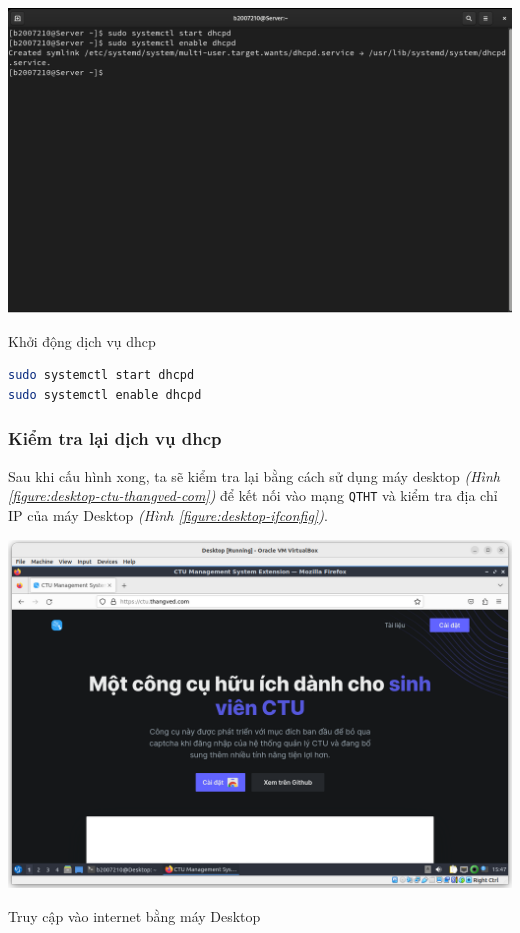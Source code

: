 \documentclass[a4paper, 11pt]{article}
\begin{document}
\begin{minipage}
    {\linewidth}
    \captionsetup{type=figure}
    \centering
    \includegraphics[width=\linewidth]{images/start-enable-dhcpd.png}
    \caption{Khởi động dịch vụ dhcp}
    \label{figure:start-enable-dhcpd}
\end{minipage}
\begin{lstlisting}[language=bash, caption=Khởi động dịch vụ dhcp]
sudo systemctl start dhcpd
sudo systemctl enable dhcpd
\end{lstlisting}

\subsubsection{Kiểm tra lại dịch vụ dhcp}

Sau khi cấu hình xong, ta sẽ kiểm tra lại bằng cách sử dụng máy desktop \textit{(Hình \ref{figure:desktop-ctu-thangved-com})} để kết nối vào mạng \texttt{QTHT} và kiểm tra địa chỉ IP của máy Desktop \textit{(Hình \ref{figure:desktop-ifconfig})}.

\begin{minipage}
    {\linewidth}
    \captionsetup{type=figure}
    \centering
    \includegraphics[width=\linewidth]{images/desktop-ctu-thangved-com.png}
    \caption{Truy cập vào internet bằng máy Desktop}
    \label{figure:desktop-ctu-thangved-com}
\end{minipage}
\end{document}
